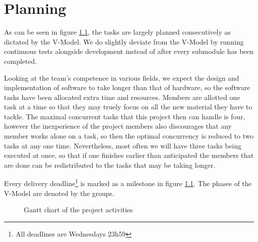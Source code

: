 \chapter{Planning}
As can be seen in figure \ref{fig:gantt}, the tasks are largely planned consecutively as dictated by the V-Model\cite{vmodel}. We do slightly deviate from the V-Model by running continuous tests alongside development instead of after every submodule has been completed.

Looking at the team's competence in various fields, we expect the design and implementation of software to take longer than that of hardware, so the software tasks have been allocated extra time and resources. Members are allotted one task at a time so that they may truely focus on all the new material they have to tackle. The maximal concurrent tasks that this project then can handle is four, however the inexperience of the project members also discourages that any member works alone on a task, so then the optimal concurrency is reduced to two tasks at any one time. Nevertheless, most often we will have three tasks being executed at once, so that if one finishes earlier than anticipated the members that are done can be redistributed to the tasks that may be taking longer.

Every delivery deadline\footnote{All deadlines are Wednesdays 23h59} is marked as a milestone in figure \ref{fig:gantt}. The phases of the V-Model are denoted by the groups.

\begin{figure}
\centering
\begin{gantt}{20}{8}
	\begin{ganttitle}
	\end{ganttitle}





\end{gantt}
\caption{Gantt chart of the project activities}
\label{fig:gantt}
\end{figure}

